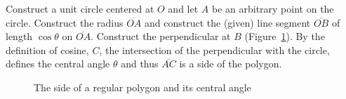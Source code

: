 \documentclass[a4paper,11pt]{article}
\begin{document}
Construct a unit circle centered at $O$ and let $A$ be an arbitrary point on the circle. Construct the radius $\overline{OA}$ and construct the (given) line segment $\overline{OB}$ of length $\cos \theta$ on $\overline{OA}$. Construct the perpendicular at $B$ (Figure~\ref{fig.cosine}). By the definition of cosine, $C$, the intersection of the perpendicular with the circle, defines the central angle $\theta$ and thus $\overline{AC}$ is a side of the polygon.
\begin{figure}[hbt]
\begin{center}
\caption{The side of a regular polygon and its central angle}\label{fig.cosine}
\end{center}
\end{figure}
\end{document}
